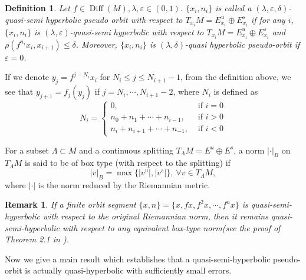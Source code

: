 \documentclass[12pt]{article}
\newtheorem{remark}{Remark}[section]
\newtheorem{definition}{Definition}[section]
\begin{document}
\begin{definition}\label{defn:2.3}
	Let $f \in \operatorname{Diff}(M),\lambda,\varepsilon\in (0,1)$. 
	$ \{x_{i},n_{i}\} $ is called a $ (\lambda,\varepsilon,\delta) $-quasi-semi hyperbolic pseudo orbit with respect to $T_{x_{i}} M=E_{x_{i}}^{u}  \oplus E_{x_{i}}^{s}$ if for any $ i $, $ \{x_{i},n_{i}\} $ is $ (\lambda,\varepsilon) $-quasi-semi hyperbolic with respect to $T_{x_{i}} M=E_{x_{i}}^{u}  \oplus E_{x_{i}}^{s}$ and $ \rho(f^{n_{i}}x_{i},x_{i+1})\leqslant \delta $.
	Moreover, $ \{x_{i},n_{i}\} $ is $ (\lambda,\delta) $-quasi hyperbolic pseudo-orbit if $\varepsilon=0$.
\end{definition}
If we denote  $  y_{j}=f^{j-N_{i}}x_{i}$ for $ N_{i}\leqslant j\leqslant N_{i+1}-1$, from the definition above, we see that $y_{j+1}=f_{j}(y_{j})$ if $j=N_{i}, \cdots, N_{i+1}-2$,
where $ N_{i} $ is defined as
$$
N_{i}=\left\{\begin{array}{ll}
	0, & \text { if } i=0 \\
	n_{0} +n_{1}+\cdots+n_{i-1}, & \text { if } i>0\\
	n_{i}+n_{i+1}+\cdots+n_{-1}, & \text { if } i<0
\end{array}\right.
$$

For a subset $\Lambda\subset M$ and a continuous splitting $T_{\Lambda}M=E^u \oplus E^s$, a norm $|\cdot |_B$ on $ T_{\Lambda}M $  is said to be of box type​ (with respect to the splitting) if
$$ |v |_B=\max\{|v^u|, |v^s| \}, \ \forall v\in T_{\Lambda}M,$$
where $|\cdot|$ is the norm reduced by the Riemannian metric.
\begin{remark}\label{rem:2.1}
	If a finite orbit segment $\{x ,n\}=\{x,fx,f^2x,\cdots,f^nx\}$ is quasi-semi-hyperbolic with respect to the original Riemannian norm, then it remains quasi-semi-hyperbolic with respect to any equivalent box-type norm(see the proof of Theorem 2.1 in \cite{LC}).
\end{remark}

Now we give a main result which establishes that a quasi-semi-hyperbolic pseudo-orbit is actually quasi-hyperbolic with sufficiently small errors.
\end{document}
